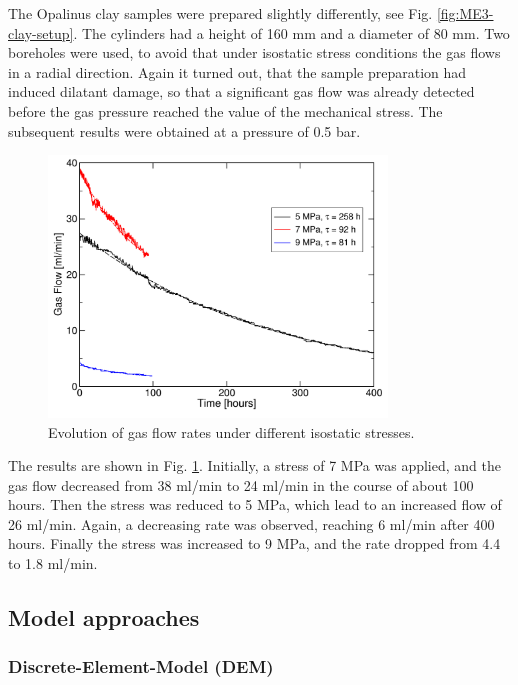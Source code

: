 The Opalinus clay samples were prepared slightly differently, see Fig. \ref{fig:ME3-clay-setup}. The cylinders had a height of 160 mm and a diameter of 80 mm. Two boreholes were used, to avoid that under isostatic stress conditions the gas flows in a radial direction. Again it turned out, that the sample preparation had induced dilatant damage, so that a significant gas flow was already detected before the gas pressure reached the value of the mechanical stress. The subsequent results were obtained at a pressure of 0.5 bar. 

\begin{figure}[!ht]
\centering
\includegraphics[width=9cm]{figures/mex3-senkrecht-alle.png}
\caption{Evolution of gas flow rates under different isostatic stresses.}
\label{fig:ME3-clay-flows}
\end{figure}

The results are shown in Fig. \ref{fig:ME3-clay-flows}. Initially, a stress of 7 MPa was applied, and the gas flow decreased from 38 ml/min to 24 ml/min in the course of about 100 hours. Then the stress was reduced to 5 MPa, which lead to an increased flow of 26 ml/min. Again, a decreasing rate was observed, reaching 6 ml/min after 400 hours. Finally the stress was increased to 9 MPa, and the rate dropped from 4.4 to 1.8 ml/min. 

\subsection{Model approaches}
\subsubsection*{Discrete-Element-Model (DEM)}

